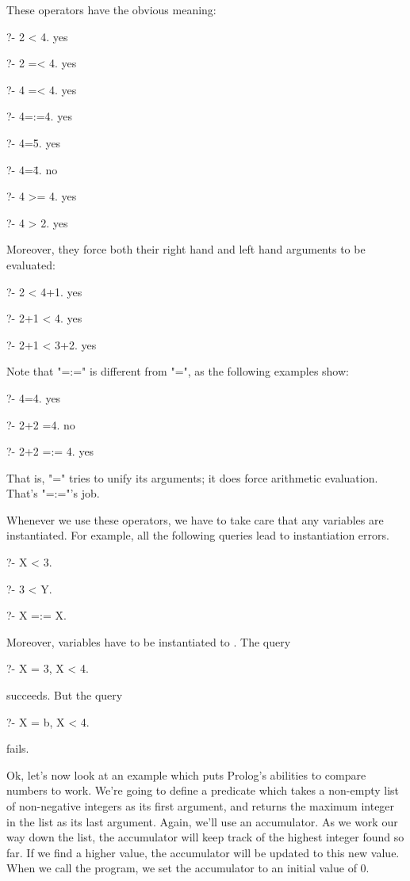 These operators have the obvious meaning:
\begin{LPNcodedisplay}
?- 2 < 4.
yes

?- 2 =< 4.
yes

?- 4 =< 4.
yes

?- 4=:=4.
yes

?- 4=\=5.
yes

?- 4=\=4.
no

?- 4 >= 4.
yes

?- 4 > 2.
yes
\end{LPNcodedisplay}


Moreover, they force both their right hand and left hand arguments to
be evaluated:
\begin{LPNcodedisplay}
?- 2 < 4+1.
yes

?- 2+1 < 4.
yes

?- 2+1 < 3+2.
yes
\end{LPNcodedisplay}


Note that "=:=" is different from "=", as the following examples show:
\begin{LPNcodedisplay}
?- 4=4.
yes

?- 2+2 =4.
no

?- 2+2 =:= 4.
yes
\end{LPNcodedisplay}
That is, "=" tries to unify its arguments; it does 
force arithmetic evaluation.  That's "=:="'s job.

Whenever we use these operators, we have to take care that any
variables are instantiated.  For example, all the following queries
lead to instantiation errors.
\begin{LPNcodedisplay}
?- X < 3.

?- 3 < Y.

?- X =:= X.
\end{LPNcodedisplay}
Moreover, variables have to be instantiated to .
The query
\begin{LPNcodedisplay}
?- X = 3, X < 4.
\end{LPNcodedisplay}
succeeds. But the query
\begin{LPNcodedisplay}
?- X = b, X < 4.
\end{LPNcodedisplay}
fails.

Ok, let's now look at an example which puts Prolog's abilities to
compare numbers to work.  We're going to define a predicate which
takes  a non-empty list of non-negative integers as its first
argument, and returns the maximum integer in the list as its last
argument.  Again, we'll use an accumulator.  As we work our way down
the list, the accumulator will keep track of the highest integer found
so far.  If we find a higher value, the accumulator will be updated to
this new value.  When we call the program, we set the accumulator to an
initial value of 0.

